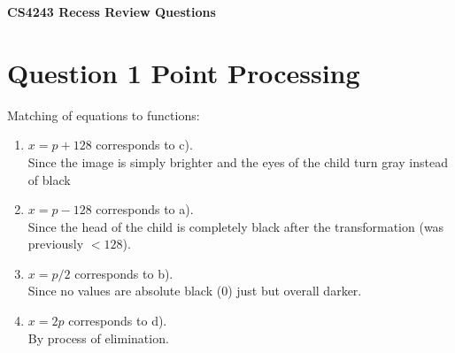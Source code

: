 \documentclass[12pt,letterpaper]{article}
\begin{document}
\textbf{\Large CS4243 Recess Review Questions}

\section*{Question 1 Point Processing}
Matching of equations to functions:
\begin{enumerate}
    \item \( x = p + 128 \) corresponds to c).  \\
    Since the image is simply brighter and the eyes of the child turn gray instead of black
    \item \( x = p - 128 \) corresponds to a). \\
    Since the head of the child is completely black after the transformation (was previously \( < 128 \)).
    \item \( x = p/2 \) corresponds to b). \\
    Since no values are absolute black (\( 0 \)) just but overall darker.
    \item \( x = 2p \) corresponds to d). \\
    By process of elimination.
\end{enumerate}
\end{document}
